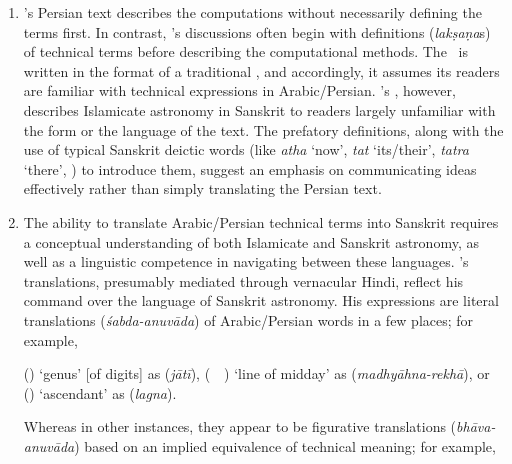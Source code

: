 \begin{enumerate}[topsep=0pt]
    \item \MullaFarid's Persian text describes the computations without necessarily defining the terms first. In contrast, \Nityananda's discussions often begin with definitions (\textit{lakṣaṇa}s) of technical terms before describing the computational methods.  
    The \ZijiShahJahani\ is written in the format of a traditional \zij, and accordingly, it assumes its readers are familiar with technical expressions in Arabic/Persian. \Nityananda's \Siddhantasindhu, however,  describes Islamicate astronomy in Sanskrit to readers largely unfamiliar with the form or the language of the text. The prefatory definitions, along with the use of typical Sanskrit deictic words (like \textit{atha} `now', \textit{tat} `its/their', \textit{tatra} `there', \etcp) to introduce them, suggest an emphasis on communicating ideas effectively rather than simply translating the Persian text.  
    \item The ability to translate Arabic/Persian technical terms into Sanskrit requires a conceptual understanding of both Islamicate and Sanskrit astronomy, as well as a linguistic competence in navigating between these languages. \Nityananda's translations, presumably mediated through vernacular Hindi, reflect his command over the language of Sanskrit astronomy. His expressions are literal translations (\textit{śabda-anuvāda}) of Arabic/Persian words in a few places; for example, 
    {\par
     (\jins) `genus' [of digits] as  (\textit{jātī}),  (\khatt\ \nisf\ \alnahar) `line of midday' as  (\textit{madhyāhna-rekhā}), or   (\tali) `ascendant' as  (\textit{lagna}).\par}
    Whereas in other instances, they appear to be figurative translations (\textit{bhāva-anuvāda}) based on an implied equivalence of technical meaning; for example,
    

\end{enumerate}
